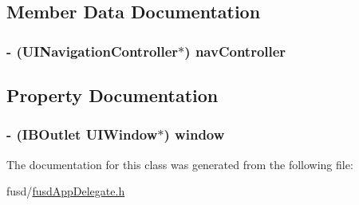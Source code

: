 \subsection{\-Member \-Data \-Documentation}
\hypertarget{interfacefusd_app_delegate_a75b88bd3c467a4f59dae59c9c2ffd349}{
\subsubsection[{nav\-Controller}]{\setlength{\rightskip}{0pt plus 5cm}-\/ (\-U\-I\-Navigation\-Controller$\ast$) {\bf nav\-Controller}}}
\label{interfacefusd_app_delegate_a75b88bd3c467a4f59dae59c9c2ffd349}


\subsection{\-Property \-Documentation}
\hypertarget{interfacefusd_app_delegate_a63be5ddda70ce950ca701711ff968b74}{
\subsubsection[{window}]{\setlength{\rightskip}{0pt plus 5cm}-\/ (\-I\-B\-Outlet \-U\-I\-Window$\ast$) window}}
\label{interfacefusd_app_delegate_a63be5ddda70ce950ca701711ff968b74}


\-The documentation for this class was generated from the following file\-:\begin{DoxyCompactItemize}
\item 
fusd/\hyperlink{fusd_app_delegate_8h}{fusd\-App\-Delegate.\-h}\end{DoxyCompactItemize}
